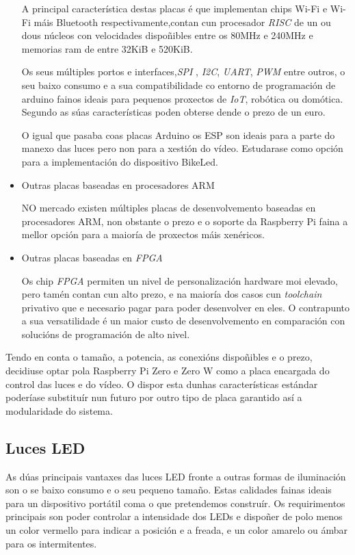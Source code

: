 \begin{itemize}
A principal característica destas placas é que implementan chips Wi-Fi e Wi-Fi máis Bluetooth respectivamente,contan cun procesador \emph{RISC} de un ou dous núcleos con velocidades dispoñibles entre os 80MHz e 240MHz e memorias ram de entre 32KiB e 520KiB.

Os seus múltiples portos e interfaces,\emph{SPI} ,  \emph{I2C}, \emph{UART}, \emph{PWM} entre outros, o seu baixo consumo e a sua compatibilidade co entorno de programación de arduino fainos ideais para pequenos proxectos de \emph{IoT}, robótica ou domótica. Segundo as súas características poden obterse dende o prezo de un euro.

O igual que pasaba coas placas Arduino os ESP son ideais para a parte do manexo das luces pero non para a xestión do vídeo. Estudarase como opción para a implementación do dispositivo BikeLed.
    \item Outras placas baseadas en procesadores ARM

NO mercado existen múltiples placas de desenvolvemento baseadas en procesadores ARM, non obstante o prezo e o soporte da Raspberry Pi faina a mellor opción para a maioría de proxectos máis xenéricos.
    \item Outras placas baseadas en \emph{FPGA}

Os chip \emph{FPGA} permiten un nivel de personalización hardware moi elevado, pero tamén contan cun alto prezo, e na maioría dos casos cun \emph{toolchain} privativo que e necesario pagar para poder desenvolver en eles. O contrapunto a sua versatilidade é un maior custo de desenvolvemento en comparación con solucións de programación de alto nivel.
\end{itemize}
Tendo en conta o tamaño, a potencia, as conexións dispoñibles e o prezo, decidiuse optar pola Raspberry Pi Zero e Zero W como a placa encargada do control das luces e do vídeo. O dispor esta dunhas características estándar poderíase substituír nun futuro por outro tipo de placa garantido así a modularidade do sistema.

\subsection{Luces LED}
As dúas principais vantaxes das luces LED fronte a outras formas de iluminación son o se baixo consumo e o seu pequeno tamaño. Estas calidades fainas ideais para un dispositivo portátil coma o que pretendemos construír.
Os requirimentos principais son poder controlar a intensidade dos LEDs e dispoñer de polo menos un color vermello para indicar a posición e a freada, e un color amarelo ou ámbar para os intermitentes.

